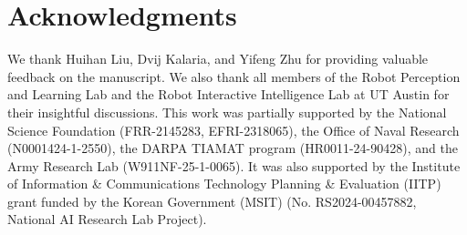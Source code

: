 \section{Acknowledgments}
We thank Huihan Liu, Dvij Kalaria, and Yifeng Zhu for providing valuable feedback on the manuscript.
We also thank all members of the Robot Perception and Learning
Lab and the Robot Interactive Intelligence Lab at UT Austin for their insightful discussions. This work was partially supported by the National Science Foundation (FRR-2145283, EFRI-2318065), the Office of Naval Research (N0001424-1-2550), the DARPA TIAMAT program (HR0011-24-90428), and the Army Research Lab (W911NF-25-1-0065).
It was also supported by the Institute of Information \& Communications Technology Planning \& Evaluation (IITP) grant funded by the Korean Government (MSIT) (No. RS2024-00457882, National AI Research Lab Project).